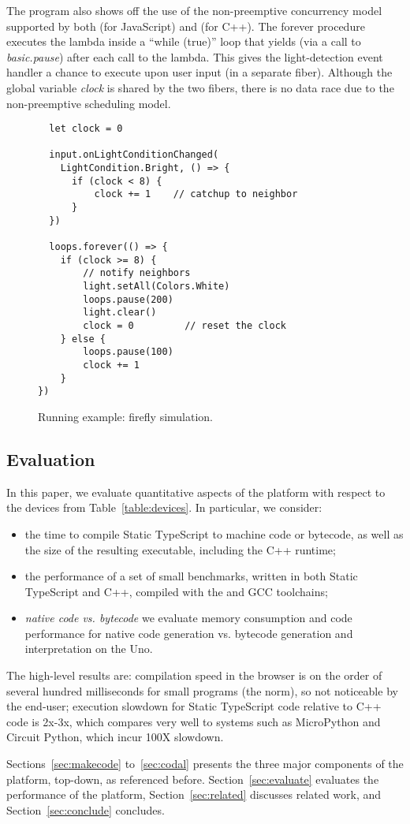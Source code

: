 The program also shows off the use of the non-preemptive concurrency
model supported by both \MC (for JavaScript) and \CO (for C++).
The forever procedure executes the lambda inside a ``while (true)''
loop that yields (via a call to \emph{basic.pause}) after each call to the lambda.
This gives the light-detection event handler a chance to execute
upon user input (in a separate fiber). Although the global variable \emph{clock} is
shared by the two fibers, there is no data race due to the non-preemptive
scheduling model.

\begin{figure}
\begin{lstlisting}
  let clock = 0

  input.onLightConditionChanged(
    LightCondition.Bright, () => {
      if (clock < 8) {
          clock += 1    // catchup to neighbor
      }
  })

  loops.forever(() => {
    if (clock >= 8) {
        // notify neighbors
        light.setAll(Colors.White)  
        loops.pause(200)
        light.clear()
        clock = 0         // reset the clock
    } else {
        loops.pause(100)
        clock += 1         
    }
})
\end{lstlisting}
\caption{\label{fig:example}Running example: firefly simulation.}
\end{figure}


\subsection{Evaluation}

In this paper, we evaluate quantitative aspects of the platform
with respect to the devices from Table~\ref{table:devices}. In particular, we
consider:
\begin{itemize}
\item the time to compile Static TypeScript to machine code or bytecode,
       as well as the size of the resulting executable, including the C++ runtime;
\item the performance of a set of small benchmarks, written in both Static TypeScript and C++,
      compiled with the \MC and GCC toolchains;
\item \emph{native code vs. bytecode} we
     evaluate memory consumption and code performance for native code generation
     vs. bytecode generation and interpretation on the Uno.
\end{itemize}
The high-level results are: compilation speed in the browser is on the order
of several hundred milliseconds for small programs (the norm), so not noticeable 
by the end-user; execution slowdown for Static TypeScript code relative to C++
code is 2x-3x, which compares very well to systems such as MicroPython and
Circuit Python, which incur 100X slowdown.

Sections~\ref{sec:makecode} to~\ref{sec:codal} presents the three major components of the platform, top-down,
as referenced before. Section~\ref{sec:evaluate} evaluates the performance of the platform,
Section~\ref{sec:related} discusses related work, and Section~\ref{sec:conclude}
concludes.
